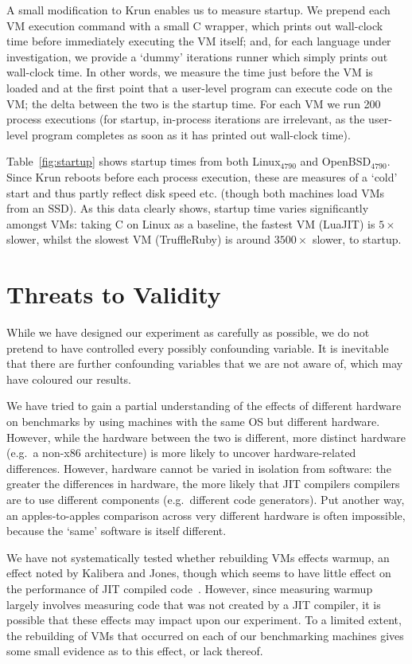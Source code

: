 \documentclass[acmsmall]{acmart}\settopmatter{printfolios=true}
\newcommand{\kalibera}{Kalibera and Jones\xspace}
\newcommand{\krun}{Krun\xspace}
\newcommand{\bencherfive}{Linux$_\mathrm{4790}$\xspace}
\newcommand{\benchersix}{OpenBSD$_\mathrm{4790}$\xspace}
\newcommand{\numstartuppexecs}{200\xspace}
\begin{document}
A small modification to \krun enables us to measure startup. We prepend each VM
execution command with a small C wrapper, which prints out wall-clock time
before immediately executing the VM itself; and, for each language under
investigation, we provide a `dummy' iterations runner which simply prints out
wall-clock time. In other words, we measure the time just before the VM is loaded
and at the first point that a user-level program can execute code on the VM; the
delta between the two is the startup time. For each VM we run \numstartuppexecs process
executions (for startup, in-process iterations are irrelevant,
as the user-level program completes as soon as it has printed out wall-clock
time).

Table~\ref{fig:startup} shows startup times from both \bencherfive and \benchersix. Since
\krun reboots before each process execution, these are measures of a `cold'
start and thus partly reflect disk speed etc. (though both machines load VMs
from an SSD). As this data clearly shows, startup time varies significantly amongst VMs:
taking C on Linux as a baseline, the fastest VM (LuaJIT) is $5\times$ slower, whilst the
slowest VM (TruffleRuby) is around $3500\times$ slower, to startup.


\section{Threats to Validity}
\label{sec:threats}

While we have designed our experiment as carefully as possible, we do not
pretend to have controlled every possibly confounding variable. It
is inevitable that there are further confounding variables that
we are not aware of, which may have coloured our results.

We have tried to gain a partial understanding of the effects of different
hardware on benchmarks by using machines with the same OS but
different hardware. However, while the hardware between the two is
different, more distinct hardware (e.g.~a non-x86 architecture)
is more likely to uncover hardware-related differences.
However, hardware cannot be varied in isolation from software:
the greater the differences in hardware, the more likely that JIT compilers
compilers are to use different components (e.g.~different code generators).
Put another way, an apples-to-apples comparison across very different
hardware is often impossible, because the `same' software is itself different.

We have not systematically tested whether rebuilding VMs effects warmup, an
effect noted by \kalibera, though which seems to have little effect on
the performance of JIT compiled code~\cite{barrett15approaches}. However, since measuring warmup largely
involves measuring code that was not created by a JIT compiler, it is possible
that these effects may impact upon our experiment. To a limited extent, the
rebuilding of VMs that occurred on each of our benchmarking machines gives
some small evidence as to this effect, or lack thereof.
\end{document}
